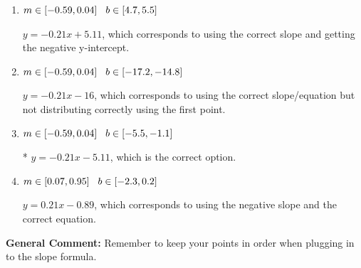 \documentclass{extbook}[14pt]
\begin{document}
\begin{enumerate}
{\begin{enumerate}[label=\Alph*.]
 $y = -0.21x + 7$, which corresponds to using the correct slope/equation but not distributing correctly using the second point.
\item \( m \in [-0.59, 0.04] \hspace*{3mm} b \in [4.7, 5.5] \)

 $y = -0.21x + 5.11$, which corresponds to using the correct slope and getting the negative y-intercept.
\item \( m \in [-0.59, 0.04] \hspace*{3mm} b \in [-17.2, -14.8] \)

 $y = -0.21x -16$, which corresponds to using the correct slope/equation but not distributing correctly using the first point.
\item \( m \in [-0.59, 0.04] \hspace*{3mm} b \in [-5.5, -1.1] \)

* $y = -0.21x -5.11$, which is the correct option.
\item \( m \in [0.07, 0.95] \hspace*{3mm} b \in [-2.3, 0.2] \)

 $y = 0.21x -0.89$, which corresponds to using the negative slope and the correct equation.
\end{enumerate}

\textbf{General Comment:} Remember to keep your points in order when plugging in to the slope formula.
}
\end{enumerate}
\end{document}
